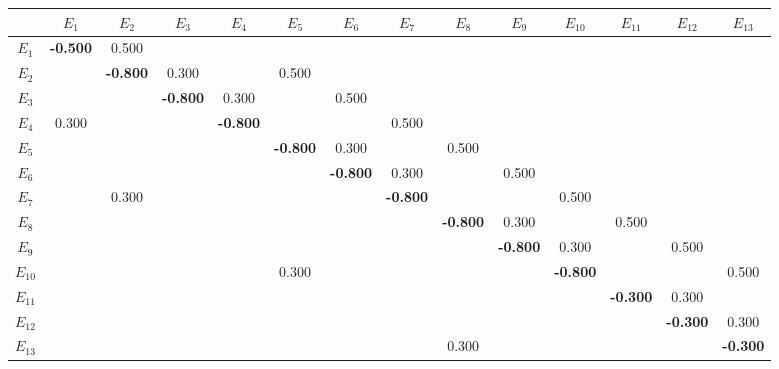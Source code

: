 \begin{tabular}{c|ccccccccccccc}
 & $E_{1}$ & $E_{2}$ & $E_{3}$ & $E_{4}$ & $E_{5}$ & $E_{6}$ & $E_{7}$ & $E_{8}$ & $E_{9}$ & $E_{10}$ & $E_{11}$ & $E_{12}$ & $E_{13}$ \\ \hline
$E_{1}$ & \textbf{-0.500} & 0.500 &  &  &  &  &  &  &  &  &  &  &  \\
$E_{2}$ &  & \textbf{-0.800} & 0.300 &  & 0.500 &  &  &  &  &  &  &  &  \\
$E_{3}$ &  &  & \textbf{-0.800} & 0.300 &  & 0.500 &  &  &  &  &  &  &  \\
$E_{4}$ & 0.300 &  &  & \textbf{-0.800} &  &  & 0.500 &  &  &  &  &  &  \\
$E_{5}$ &  &  &  &  & \textbf{-0.800} & 0.300 &  & 0.500 &  &  &  &  &  \\
$E_{6}$ &  &  &  &  &  & \textbf{-0.800} & 0.300 &  & 0.500 &  &  &  &  \\
$E_{7}$ &  & 0.300 &  &  &  &  & \textbf{-0.800} &  &  & 0.500 &  &  &  \\
$E_{8}$ &  &  &  &  &  &  &  & \textbf{-0.800} & 0.300 &  & 0.500 &  &  \\
$E_{9}$ &  &  &  &  &  &  &  &  & \textbf{-0.800} & 0.300 &  & 0.500 &  \\
$E_{10}$ &  &  &  &  & 0.300 &  &  &  &  & \textbf{-0.800} &  &  & 0.500 \\
$E_{11}$ &  &  &  &  &  &  &  &  &  &  & \textbf{-0.300} & 0.300 &  \\
$E_{12}$ &  &  &  &  &  &  &  &  &  &  &  & \textbf{-0.300} & 0.300 \\
$E_{13}$ &  &  &  &  &  &  &  & 0.300 &  &  &  &  & \textbf{-0.300} \\
\end{tabular}
